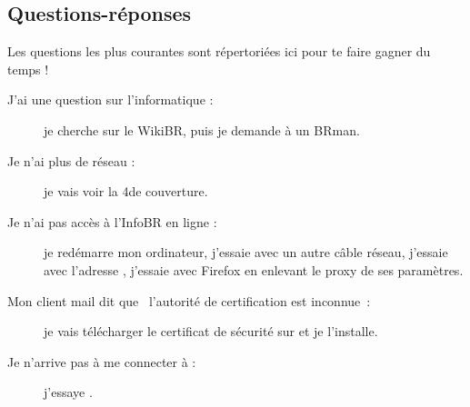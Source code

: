 \subsection{Questions-réponses}

Les questions les plus courantes sont répertoriées ici pour te faire gagner du temps !

\begin{description}

\item[J'ai une question sur l'informatique : ] je cherche sur le WikiBR, puis je demande à un BRman.

\item[Je n'ai plus de réseau : ] je vais voir la 4\ieme de couverture.

\item[Je n'ai pas accès à l'InfoBR en ligne : ] je redémarre mon ordinateur, j'essaie avec un autre câble réseau, j'essaie avec l'adresse , j'essaie avec Firefox en enlevant le proxy de ses paramètres.

\item[Mon client mail dit que \guillemotleft~l'autorité de certification est inconnue~\guillemotright : ] je vais télécharger le certificat de sécurité
sur  et je l'installe.


\item[Je n'arrive pas à me connecter à  : ] j'essaye .




\end{description}
